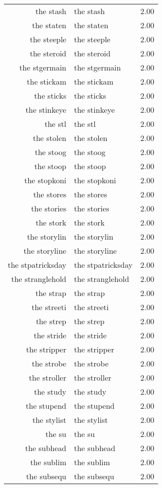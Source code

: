 \begin{table}[ht]
\begin{tabular}{rlr}
  the stash & the stash & 2.00 \\ 
  the staten & the staten & 2.00 \\ 
  the steeple & the steeple & 2.00 \\ 
  the steroid & the steroid & 2.00 \\ 
  the stgermain & the stgermain & 2.00 \\ 
  the stickam & the stickam & 2.00 \\ 
  the sticks & the sticks & 2.00 \\ 
  the stinkeye & the stinkeye & 2.00 \\ 
  the stl & the stl & 2.00 \\ 
  the stolen & the stolen & 2.00 \\ 
  the stoog & the stoog & 2.00 \\ 
  the stoop & the stoop & 2.00 \\ 
  the stopkoni & the stopkoni & 2.00 \\ 
  the stores & the stores & 2.00 \\ 
  the stories & the stories & 2.00 \\ 
  the stork & the stork & 2.00 \\ 
  the storylin & the storylin & 2.00 \\ 
  the storyline & the storyline & 2.00 \\ 
  the stpatricksday & the stpatricksday & 2.00 \\ 
  the stranglehold & the stranglehold & 2.00 \\ 
  the strap & the strap & 2.00 \\ 
  the streeti & the streeti & 2.00 \\ 
  the strep & the strep & 2.00 \\ 
  the stride & the stride & 2.00 \\ 
  the stripper & the stripper & 2.00 \\ 
  the strobe & the strobe & 2.00 \\ 
  the stroller & the stroller & 2.00 \\ 
  the study & the study & 2.00 \\ 
  the stupend & the stupend & 2.00 \\ 
  the stylist & the stylist & 2.00 \\ 
  the su & the su & 2.00 \\ 
  the subhead & the subhead & 2.00 \\ 
  the sublim & the sublim & 2.00 \\ 
  the subsequ & the subsequ & 2.00 \\ 

\end{tabular}
\end{table}
